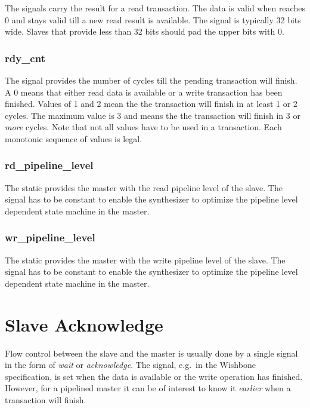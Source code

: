 The  signals carry the result for a read transaction.
The data is valid when  reaches 0 and stays valid
till a new read result is available. The signal is typically 32 bits
wide. Slaves that provide less than 32 bits should pad the upper
bits with 0.

\subsubsection{rdy\_cnt}

The  signal provides the number of cycles till the
pending transaction will finish. A 0 means that either read data is
available or a write transaction has been finished. Values of 1 and
2 mean the the transaction will finish in at least 1 or 2 cycles.
The maximum value is 3 and means the the transaction will finish in
3 or \emph{more} cycles. Note that not all values have to be used in
a transaction. Each monotonic sequence of  values is
legal.

\subsubsection{rd\_pipeline\_level}

The static  provides the master with the
read pipeline level of the slave. The signal has to be constant to
enable the synthesizer to optimize the pipeline level dependent
state machine in the master.


\subsubsection{wr\_pipeline\_level}

The static  provides the master with the
write pipeline level of the slave. The signal has to be constant to
enable the synthesizer to optimize the pipeline level dependent
state machine in the master.

\section{Slave Acknowledge}
\label{sec:ack}

Flow control between the slave and the master is usually done by a
single signal in the form of \emph{wait} or \emph{acknowledge}. The
 signal, e.g.\ in the Wishbone specification, is set when
the data is available or the write operation has finished. However,
for a pipelined master it can be of interest to know it
\emph{earlier} when a transaction will finish.

